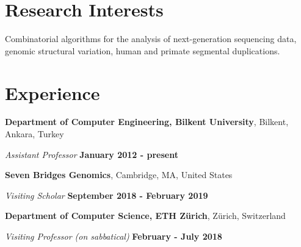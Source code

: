 \documentclass[margin,line]{res}
\begin{document}
\begin{resume}

  
  
  \section{\sc Research Interests}
  Combinatorial algorithms for the analysis of next-generation sequencing data, 
  genomic structural variation,  human and primate
  segmental duplications. %

          \section{\sc Experience}
                  {\bf Department of Computer Engineering, Bilkent University},
                  Bilkent, Ankara, Turkey
                  
                  \vspace{-.3cm}
                         {\em Assistant Professor} \hfill {\bf January 2012 - present} 

                 {\bf Seven Bridges Genomics},
                  Cambridge, MA, United States
                  
                  \vspace{-.1cm}
                         {\em Visiting Scholar} \hfill {\bf September 2018 - February 2019} 

                 {\bf Department of Computer Science, ETH Zürich},
                  Zürich, Switzerland
                  
                  \vspace{-.1cm}
                         {\em Visiting Professor (on sabbatical)} \hfill {\bf February - July 2018} 
                         

\end{resume}
\end{document}
